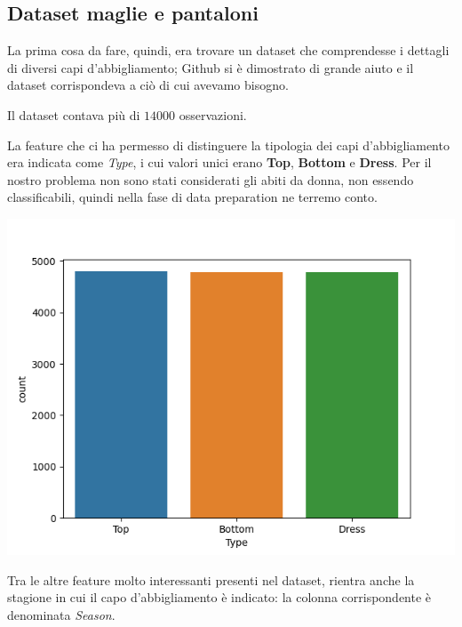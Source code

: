 \documentclass[a4paper, 11pt, oneside]{report}
\begin{document}
                \subsection{Dataset maglie e pantaloni}\label{subsec:dataset-maglia-pantaloni}
                La prima cosa da fare, quindi, era trovare un dataset che comprendesse i dettagli di diversi capi d'abbigliamento;
                Github si è dimostrato di grande aiuto e il dataset \cite{6} corrispondeva a ciò di cui avevamo bisogno.
                \\
                \par \noindent Il dataset contava più di $14000$ osservazioni.
                \\
                \par \noindent La feature che ci ha permesso di distinguere la tipologia dei capi d'abbigliamento
                era indicata come \textit{Type}, i cui valori unici erano \textbf{Top}, \textbf{Bottom} e \textbf{Dress}.
                Per il nostro problema non sono stati considerati gli abiti da donna, non essendo classificabili,
                quindi nella fase di data preparation ne terremo conto.
                \begin{center}
                    \includegraphics[scale=0.4]{countTopBottom}
                \end{center}
                \bigskip
                \par \noindent Tra le altre feature molto interessanti presenti nel dataset, rientra anche la stagione
                in cui il capo d'abbigliamento è indicato: la colonna corrispondente è denominata \textit{Season}.
\end{document}
